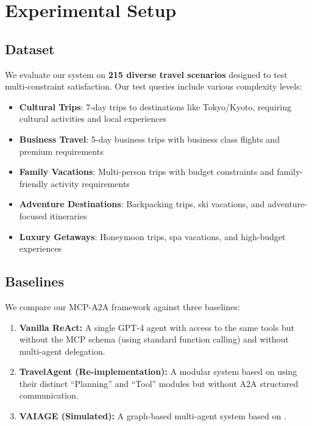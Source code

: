 \documentclass[conference]{IEEEtran}
\begin{document}
\section{Experimental Setup}

\subsection{Dataset}
We evaluate our system on \textbf{215 diverse travel scenarios} designed to test multi-constraint satisfaction. Our test queries include various complexity levels:

\begin{itemize}
    \item \textbf{Cultural Trips}: 7-day trips to destinations like Tokyo/Kyoto, requiring cultural activities and local experiences
    \item \textbf{Business Travel}: 5-day business trips with business class flights and premium requirements
    \item \textbf{Family Vacations}: Multi-person trips with budget constraints and family-friendly activity requirements
    \item \textbf{Adventure Destinations}: Backpacking trips, ski vacations, and adventure-focused itineraries
    \item \textbf{Luxury Getaways}: Honeymoon trips, spa vacations, and high-budget experiences
\end{itemize}

\subsection{Baselines}
We compare our MCP-A2A framework against three baselines:
\begin{enumerate}
    \item \textbf{Vanilla ReAct:} A single GPT-4 agent with access to the same tools but without the MCP schema (using standard function calling) and without multi-agent delegation.
    \item \textbf{TravelAgent (Re-implementation):} A modular system based on \cite{chen2024travelagent} using their distinct ``Planning'' and ``Tool'' modules but without A2A structured communication.
    \item \textbf{VAIAGE (Simulated):} A graph-based multi-agent system based on \cite{ge2025vaiage}.
\end{enumerate}
\end{document}
